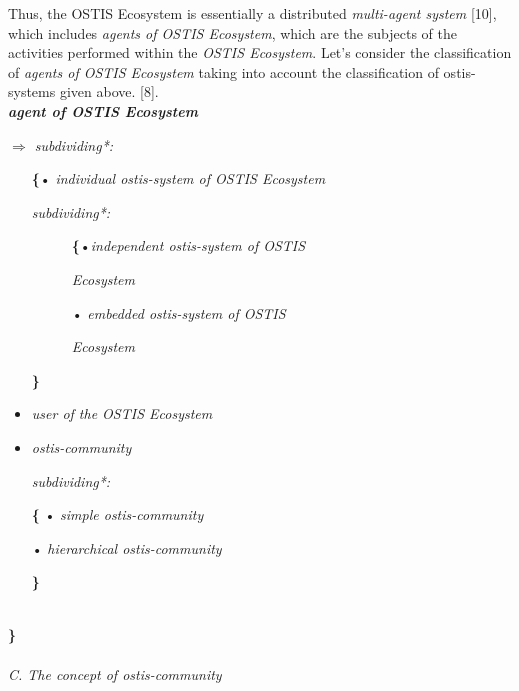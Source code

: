 \documentclass[a4paper,10pt]{article}
\begin{document}
\begin{multicols}{2}
Thus, the OSTIS Ecosystem is essentially a distributed
\textit{multi-agent system} [10], which includes \textit{agents of OSTIS
Ecosystem}, which are the subjects of the activities performed within the\textit{ OSTIS Ecosystem}. Let’s consider the
classification of \textit{agents of OSTIS Ecosystem} taking into
account the classification of ostis-systems given above.
[8].\\


\hspace{-0.6cm}\textbf{\textit{agent of OSTIS Ecosystem}}


\hspace{-0.6cm}\textit{$\Rightarrow$ subdividing*:}
\begin{itemize}
    \item [\textbf{\{}•] \textit{individual ostis-system of OSTIS 
    Ecosystem}
    
\textit{\Rightarrow subdividing*: }


\begin{description}
        \item[]\hspace{0.2cm}\textbf{\{}•\hspace{0.2cm}\textit{independent ostis-system of OSTIS}
        \item[]\hspace{0.7cm}\textit{Ecosystem}
        \item[]\hspace{0.4cm}•\textit{ embedded ostis-system of OSTIS}
        \item[]\hspace{0.7cm}\textit{Ecosystem}
    \end{description}






\hspace{0.5cm}\textbf{\}}
 \item \textit{user of the OSTIS Ecosystem}
 \item \textit{ostis-community }

 
\textit{\Rightarrow subdividing*:}


\hspace{0.4cm}\textbf{\{} • \textit{ simple ostis-community}



\hspace{0.6cm} • \textit{hierarchical ostis-community}


\hspace{0.4cm}\textbf{\}}
\end{itemize} \\
\hspace{0.4cm}\textbf{\}}
\\ \\
\hspace{-0.4cm}\textit{\vspace{0.2cm}C. The concept of ostis-community}



\end{multicols}
\end{document}
